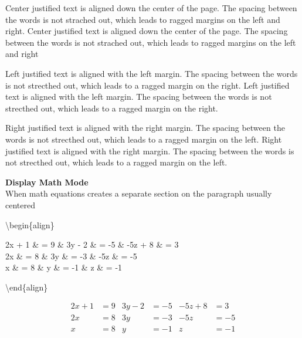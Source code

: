 \documentclass[a4paper, 12pt]{book}
\begin{document}
\begin{center}
Center justified text is aligned down the center of the page. The spacing between the words is not strached out, which leads to ragged margins on the left and right. Center justified text is aligned down the center of the page. The spacing between the words is not strached out, which leads to ragged margins on the left and right
\end{center}

\begin{flushleft}
  Left justified text is aligned with the left margin. The spacing between the words is not strecthed out, which leads to a ragged margin on the right.  Left justified text is aligned with the left margin. The spacing between the words is not strecthed out, which leads to a ragged margin on the right.
\end{flushleft}

\begin{flushright}
  Right justified text is aligned with the right margin. The spacing between the words is not strecthed out, which leads to a ragged margin on the left.  Right justified text is aligned with the right margin. The spacing between the words is not strecthed out, which leads to a ragged margin on the left.
\end{flushright}


\setlength{\parindent}{1cm}


\break
\begin{center}
  \Large{\textbf{Display Math Mode}} \\
  \normalsize When math equations creates a separate section on the paragraph usually centered
\end{center}
\textbackslash begin\{align\}

\noindent  2x + 1 \& = 9  \& 3y - 2 \& = -5  \&  -5z + 8 \& = 3 \\
\-\hspace{0.7cm} 2x \& = 8  \&     3y \& = -3  \&     -5z \& = -5 \\
\-\hspace{1cm} x \& = 8  \&      y \& = -1  \&       z \& = -1
      
\noindent\textbackslash end\{align\}

\begin{align}
  2x + 1 & = 9  & 3y - 2 & = -5  &  -5z + 8 & = 3 \\
      2x & = 8  &     3y & = -3  &     -5z & = -5 \\
       x & = 8  &      y & = -1  &       z & = -1
\end{align}
\end{document}
